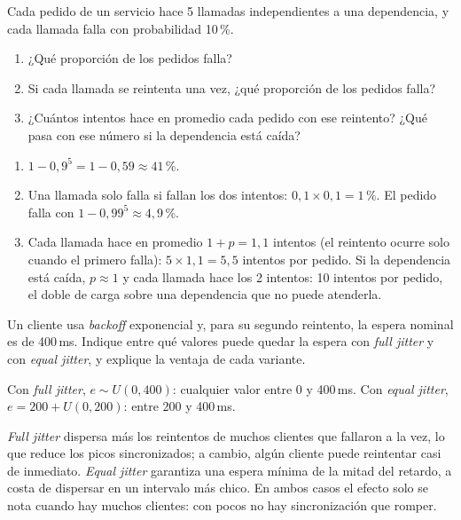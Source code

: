 \documentclass[variant=guia,cover=institutional,mode=screen]{ua-engineering-v6-article}
\begin{document}
\begin{uaexercise}
Cada pedido de un servicio hace 5 llamadas independientes a una dependencia, y cada llamada falla con probabilidad 10\,\%.
\begin{enumerate}
\item ¿Qué proporción de los pedidos falla?
\item Si cada llamada se reintenta una vez, ¿qué proporción de los pedidos falla?
\item ¿Cuántos intentos hace en promedio cada pedido con ese reintento? ¿Qué pasa con ese número si la dependencia está caída?
\end{enumerate}
\end{uaexercise}
\begin{uaanswer}
\begin{enumerate}
\item $1 - 0{,}9^5 = 1 - 0{,}59 \approx 41\,\%$.
\item Una llamada solo falla si fallan los dos intentos: $0{,}1 \times 0{,}1 = 1\,\%$. El pedido falla con $1 - 0{,}99^5 \approx 4{,}9\,\%$.
\item Cada llamada hace en promedio $1 + p = 1{,}1$ intentos (el reintento ocurre solo cuando el primero falla): $5 \times 1{,}1 = 5{,}5$ intentos por pedido. Si la dependencia está caída, $p \approx 1$ y cada llamada hace los 2 intentos: 10 intentos por pedido, el doble de carga sobre una dependencia que no puede atenderla.
\end{enumerate}
\end{uaanswer}

\begin{uaexercise}
Un cliente usa \emph{backoff} exponencial y, para su segundo reintento, la espera nominal es de 400\,ms. Indique entre qué valores puede quedar la espera con \emph{full jitter} y con \emph{equal jitter}, y explique la ventaja de cada variante.
\end{uaexercise}
\begin{uaanswer}
Con \emph{full jitter}, $e \sim U(0, 400)$: cualquier valor entre 0 y 400\,ms. Con \emph{equal jitter}, $e = 200 + U(0, 200)$: entre 200 y 400\,ms.

\emph{Full jitter} dispersa más los reintentos de muchos clientes que fallaron a la vez, lo que reduce los picos sincronizados; a cambio, algún cliente puede reintentar casi de inmediato. \emph{Equal jitter} garantiza una espera mínima de la mitad del retardo, a costa de dispersar en un intervalo más chico. En ambos casos el efecto solo se nota cuando hay muchos clientes: con pocos no hay sincronización que romper.
\end{uaanswer}
\end{document}
